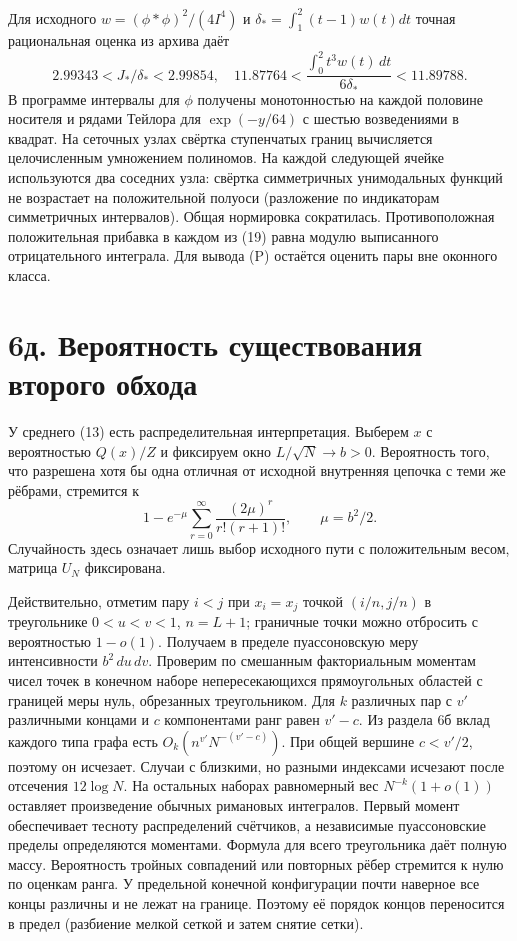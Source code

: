 \documentclass[11pt,a4paper]{article}
\newcommand{\sect}[1]{\section*{\sffamily\color{ink}#1}}
\begin{document}
Для исходного $w=(\phi*\phi)^2/(4I^4)$ и $\delta_*=\int_1^2(t-1)w(t)dt$ точная рациональная оценка из архива даёт
\[
                       2.99343<J_*/\delta_*<2.99854,\quad 11.87764<\frac{\int_0^2 t^3 w(t)\,dt}{6\delta_*}<11.89788.
\]
В программе интервалы для $\phi$ получены монотонностью на каждой половине носителя и рядами Тейлора для $\exp(-y/64)$ с шестью возведениями в квадрат. На сеточных узлах свёртка ступенчатых границ вычисляется целочисленным умножением полиномов. На каждой следующей ячейке используются два соседних узла: свёртка симметричных унимодальных функций не возрастает на положительной полуоси (разложение по индикаторам симметричных интервалов). Общая нормировка сократилась. Противоположная положительная прибавка в каждом из (19) равна модулю выписанного отрицательного интеграла. Для вывода (P) остаётся оценить пары вне оконного класса.
\newpage
\sect{6д. Вероятность существования второго обхода}
У среднего (13) есть распределительная интерпретация. Выберем $x$ с вероятностью $Q(x)/Z$ и фиксируем окно $L/\sqrt N\to b>0$. Вероятность того, что разрешена хотя бы одна отличная от исходной внутренняя цепочка с теми же рёбрами, стремится к
\[
                 1-e^{-\mu}\sum_{r=0}^\infty
                         \frac{(2\mu)^r}{r!(r+1)!},\qquad \mu=b^2/2.        \tag{20}
\]
Случайность здесь означает лишь выбор исходного пути с положительным весом, матрица $U_N$ фиксирована.

Действительно, отметим пару $i<j$ при $x_i=x_j$ точкой $(i/n,j/n)$ в треугольнике $0<u<v<1$, $n=L+1$; граничные точки можно отбросить с вероятностью $1-o(1)$. Получаем в пределе пуассоновскую меру интенсивности $b^2\,du\,dv$. Проверим по смешанным факториальным моментам чисел точек в конечном наборе непересекающихся прямоугольных областей с границей меры нуль, обрезанных треугольником. Для $k$ различных пар с $v'$ различными концами и $c$ компонентами ранг равен $v'-c$. Из раздела 6б вклад каждого типа графа есть $O_k(n^{v'}N^{-(v'-c)})$. При общей вершине $c<v'/2$, поэтому он исчезает. Случаи с близкими, но разными индексами исчезают после отсечения $12\log N$. На остальных наборах равномерный вес $N^{-k}(1+o(1))$ оставляет произведение обычных римановых интегралов. Первый момент обеспечивает тесноту распределений счётчиков, а независимые пуассоновские пределы определяются моментами. Формула для всего треугольника даёт полную массу. Вероятность тройных совпадений или повторных рёбер стремится к нулю по оценкам ранга. У предельной конечной конфигурации почти наверное все концы различны и не лежат на границе. Поэтому её порядок концов переносится в предел (разбиение мелкой сеткой и затем снятие сетки).
\end{document}
